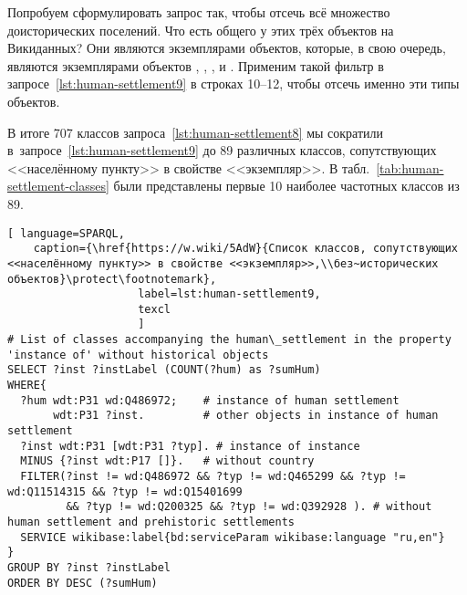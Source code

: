 Попробуем сформулировать запрос так, чтобы отсечь всё множество доисторических поселений.  
Что есть общего у этих трёх объектов на Викиданных? 
Они являются экземплярами объектов, которые, в свою очередь, 
являются экземплярами объектов , 
, 
, 
и . 
Применим такой фильтр в запросе~\ref{lst:human-settlement9} в строках 10--12, 
чтобы отсечь именно эти типы объектов.

В итоге 707 классов запроса~\ref{lst:human-settlement8} 
мы сократили в~запросе~\ref{lst:human-settlement9} 
до 89 различных классов, сопутствующих <<населённому пункту>> в свойстве <<экземпляр>>. 
В табл.~\ref{tab:human-settlement-classes} были представлены 
первые 10 наиболее частотных классов из 89. 



\newpage
\lstset{numbers=left, firstnumber=1, frame=single}
\begin{lstlisting}[ language=SPARQL, 
    caption={\href{https://w.wiki/5AdW}{Cписок классов, сопутствующих <<населённому пункту>> в свойстве <<экземпляр>>,\\без~исторических объектов}\protect\footnotemark},
                    label=lst:human-settlement9,
                    texcl 
                    ]
# List of classes accompanying the human\_settlement in the property 'instance of' without historical objects 
SELECT ?inst ?instLabel (COUNT(?hum) as ?sumHum)
WHERE{
  ?hum wdt:P31 wd:Q486972;    # instance of human settlement
       wdt:P31 ?inst.         # other objects in instance of human settlement
  ?inst wdt:P31 [wdt:P31 ?typ]. # instance of instance
  MINUS {?inst wdt:P17 []}.   # without country
  FILTER(?inst != wd:Q486972 && ?typ != wd:Q465299 && ?typ != wd:Q11514315 && ?typ != wd:Q15401699 
         && ?typ != wd:Q200325 && ?typ != wd:Q392928 ). # without human settlement and prehistoric settlements
  SERVICE wikibase:label{bd:serviceParam wikibase:language "ru,en"}
}
GROUP BY ?inst ?instLabel
ORDER BY DESC (?sumHum)
\end{lstlisting}%




